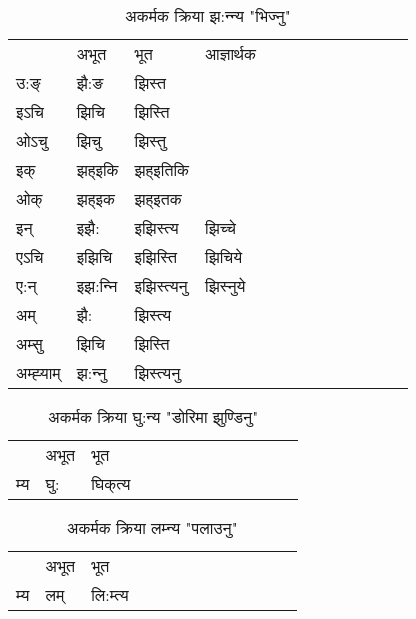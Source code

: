 \begin{table}[H]
\label{it.vi} \centering
\caption{अकर्मक क्रिया  झ:न्‍न्य  "भिज्नु"  }
\begin{tabular}{l|l|l|l|l|l|l|l|l|l|l|l|l}  \toprule
&अभूत & भूत & आज्ञार्थक \\ 
उ:ङ्‌ &झै:ङ &झिस्त \\ 
इऽचि &झिचि &झिस्ति   \\ 
ओऽचु &झिचु &झिस्तु   \\ 
इक् &झह्इकि &झह्इतिकि   \\ 
ओक् &झह्इक &झह्इतक   \\ 
इन् & इझै: & इझिस्त्य &झिच्‍चे  \\ 
एऽचि & इझिचि & इझिस्ति &झिचिये    \\ 
ए:न् & इझ:न्‍नि  & इझिस्त्यनु &झिस्‍नुये  \\ 
अम् & झै: & झिस्त्य   \\ 
अम्सु & झिचि & झिस्ति   \\ 
अम्ह्‍याम् & झ:न्‍नु  & झिस्त्यनु \\ 
\bottomrule
\end{tabular}
\end{table}


\begin{table}[H]
\label{ik.vi} \centering
\caption{अकर्मक क्रिया  घु:न्य  "डोरिमा झुण्डिनु"  }
\begin{tabular}{l|l|l|l|l|l|l|l|l|l|l|l|l}  \toprule
&अभूत & भूत   \\ 
म्य & घु: & घिक्‌त्य   \\ 
\bottomrule
\end{tabular}
\end{table}


\begin{table}[H]
\label{im.vi} \centering
\caption{अकर्मक क्रिया  लम्‍न्य  "पलाउनु"  }
\begin{tabular}{l|l|l|l|l|l|l|l|l|l|l|l|l}  \toprule
&अभूत & भूत   \\ 
म्य & लम् & लि:म्त्य   \\ 
\bottomrule
\end{tabular}
\end{table}


